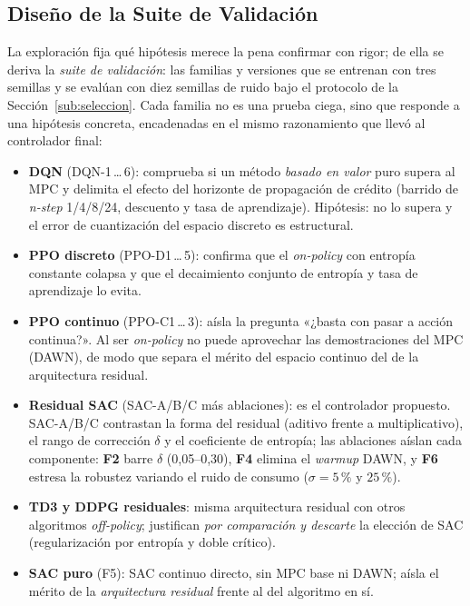 \documentclass[12pt, a4paper, twoside]{report}
\begin{document}
\subsection{Diseño de la Suite de Validación}
\label{sub:suite}

La exploración fija qué hipótesis merece la pena confirmar con rigor; de ella se
deriva la \emph{suite de validación}: las familias y versiones que se entrenan con
tres semillas y se evalúan con diez semillas de ruido bajo el protocolo de la
Sección~\ref{sub:seleccion}. Cada familia no es una prueba ciega, sino que responde
a una hipótesis concreta, encadenadas en el mismo razonamiento que llevó al
controlador final:

\begin{itemize}
  \item \textbf{DQN} (DQN-1\,\ldots\,6): comprueba si un método \emph{basado en valor}
    puro supera al MPC y delimita el efecto del horizonte de propagación de crédito
    (barrido de \textit{n-step} 1/4/8/24, descuento y tasa de aprendizaje). Hipótesis:
    no lo supera y el error de cuantización del espacio discreto es estructural.
  \item \textbf{PPO discreto} (PPO-D1\,\ldots\,5): confirma que el \textit{on-policy}
    con entropía constante colapsa y que el decaimiento conjunto de entropía y tasa
    de aprendizaje lo evita.
  \item \textbf{PPO continuo} (PPO-C1\,\ldots\,3): aísla la pregunta «¿basta con pasar
    a acción continua?». Al ser \textit{on-policy} no puede aprovechar las
    demostraciones del MPC (DAWN), de modo que separa el mérito del espacio continuo
    del de la arquitectura residual.
  \item \textbf{Residual SAC} (SAC-A/B/C más ablaciones): es el controlador propuesto.
    SAC-A/B/C contrastan la forma del residual (aditivo frente a multiplicativo), el
    rango de corrección $\delta$ y el coeficiente de entropía; las ablaciones aíslan
    cada componente: \textbf{F2} barre $\delta$ (0,05--0,30), \textbf{F4} elimina el
    \textit{warmup} DAWN, y \textbf{F6} estresa la robustez variando el ruido de
    consumo ($\sigma=5\,\%$ y $25\,\%$).
  \item \textbf{TD3 y DDPG residuales}: misma arquitectura residual con otros
    algoritmos \textit{off-policy}; justifican \emph{por comparación y descarte} la
    elección de SAC (regularización por entropía y doble crítico).
  \item \textbf{SAC puro} (F5): SAC continuo directo, sin MPC base ni DAWN; aísla el
    mérito de la \emph{arquitectura residual} frente al del algoritmo en sí.
\end{itemize}
\end{document}

